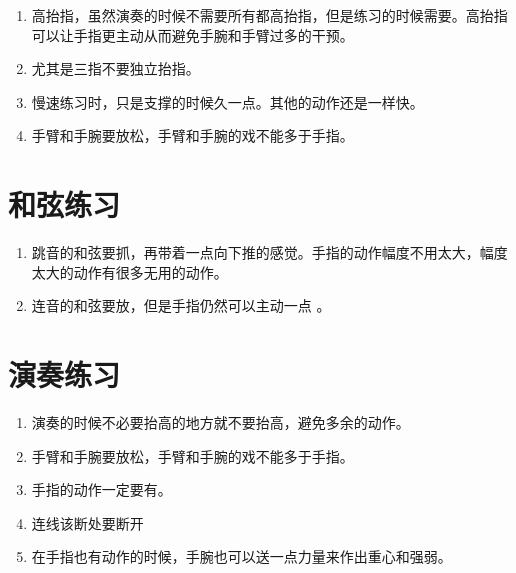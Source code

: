 \documentclass[UTF8]{ctexart}
\begin{document}
\begin{enumerate}
    \item 高抬指，虽然演奏的时候不需要所有都高抬指，但是练习的时候需要。高抬指可以让手指更主动从而避免手腕和手臂过多的干预。
    \item 尤其是三指不要独立抬指。
    \item 慢速练习时，只是支撑的时候久一点。其他的动作还是一样快。
    \item 手臂和手腕要放松，手臂和手腕的戏不能多于手指。
\end{enumerate}

\section{和弦练习}

\begin{enumerate}
    \item 跳音的和弦要抓，再带着一点向下推的感觉。手指的动作幅度不用太大，幅度太大的动作有很多无用的动作。 
    \item 连音的和弦要放，但是手指仍然可以主动一点 。
\end{enumerate}

\section{演奏练习}

\begin{enumerate}
    \item 演奏的时候不必要抬高的地方就不要抬高，避免多余的动作。 
    \item 手臂和手腕要放松，手臂和手腕的戏不能多于手指。
    \item 手指的动作一定要有。
    \item 连线该断处要断开
    \item 在手指也有动作的时候，手腕也可以送一点力量来作出重心和强弱。
\end{enumerate}
\end{document}

